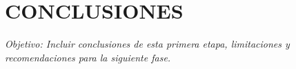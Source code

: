 \chapter*{\center \Large CONCLUSIONES} 


\noindent \textit{Objetivo:  Incluir conclusiones de esta primera etapa, limitaciones y recomendaciones para la siguiente fase.}



\newpage